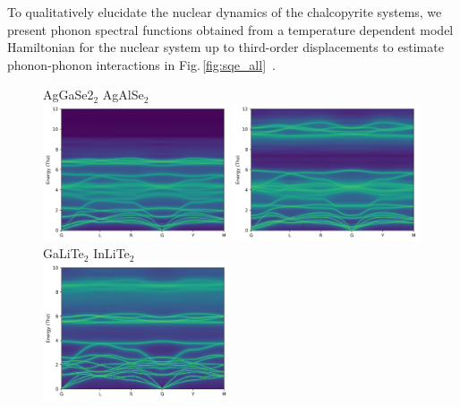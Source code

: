To qualitatively elucidate the nuclear dynamics of the chalcopyrite systems, we present phonon spectral functions obtained from a temperature dependent model Hamiltonian for the nuclear system up to third-order displacements to estimate phonon-phonon interactions in Fig.\,\ref{fig:sqe_all}~\cite{Hellman2013,Hellman2013b,Squires}.
%
\begin{figure}
	\centering
	AgGaSe2$_2$ \hspace{3.7cm} AgAlSe$_2$\\
	\includegraphics[width=0.49\textwidth]{./data/plots/spectral_functions/122.04.AgGaSe2.12.png}
	\includegraphics[width=0.49\textwidth]{./data/plots/spectral_functions/122.04.AgAlSe2.12.png}
	\\
	GaLiTe$_2$ \hspace{3.7cm} InLiTe$_2$\\
	\includegraphics[width=0.49\textwidth]{./data/plots/spectral_functions/122.04.GaLiTe2.png}

\end{figure}
